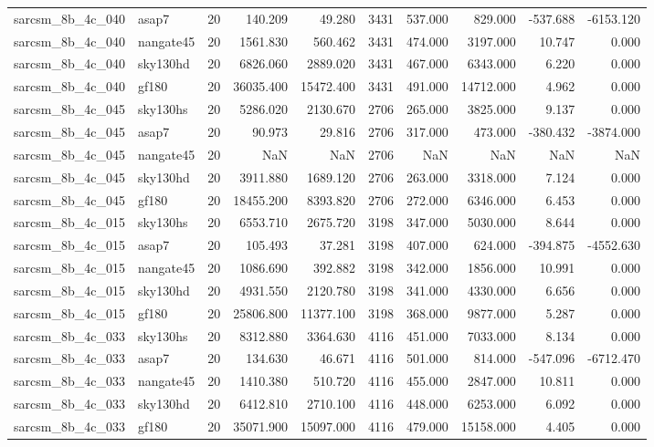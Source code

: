 \documentclass{article}
\begin{document}
\begin{longtable}{llrrrrrrrr}
sarcsm\_8b\_4c\_040 & asap7 & 20 & 140.209 & 49.280 & 3431 & 537.000 & 829.000 & -537.688 & -6153.120 \\
sarcsm\_8b\_4c\_040 & nangate45 & 20 & 1561.830 & 560.462 & 3431 & 474.000 & 3197.000 & 10.747 & 0.000 \\
sarcsm\_8b\_4c\_040 & sky130hd & 20 & 6826.060 & 2889.020 & 3431 & 467.000 & 6343.000 & 6.220 & 0.000 \\
sarcsm\_8b\_4c\_040 & gf180 & 20 & 36035.400 & 15472.400 & 3431 & 491.000 & 14712.000 & 4.962 & 0.000 \\
sarcsm\_8b\_4c\_045 & sky130hs & 20 & 5286.020 & 2130.670 & 2706 & 265.000 & 3825.000 & 9.137 & 0.000 \\
sarcsm\_8b\_4c\_045 & asap7 & 20 & 90.973 & 29.816 & 2706 & 317.000 & 473.000 & -380.432 & -3874.000 \\
sarcsm\_8b\_4c\_045 & nangate45 & 20 & NaN & NaN & 2706 & NaN & NaN & NaN & NaN \\
sarcsm\_8b\_4c\_045 & sky130hd & 20 & 3911.880 & 1689.120 & 2706 & 263.000 & 3318.000 & 7.124 & 0.000 \\
sarcsm\_8b\_4c\_045 & gf180 & 20 & 18455.200 & 8393.820 & 2706 & 272.000 & 6346.000 & 6.453 & 0.000 \\
sarcsm\_8b\_4c\_015 & sky130hs & 20 & 6553.710 & 2675.720 & 3198 & 347.000 & 5030.000 & 8.644 & 0.000 \\
sarcsm\_8b\_4c\_015 & asap7 & 20 & 105.493 & 37.281 & 3198 & 407.000 & 624.000 & -394.875 & -4552.630 \\
sarcsm\_8b\_4c\_015 & nangate45 & 20 & 1086.690 & 392.882 & 3198 & 342.000 & 1856.000 & 10.991 & 0.000 \\
sarcsm\_8b\_4c\_015 & sky130hd & 20 & 4931.550 & 2120.780 & 3198 & 341.000 & 4330.000 & 6.656 & 0.000 \\
sarcsm\_8b\_4c\_015 & gf180 & 20 & 25806.800 & 11377.100 & 3198 & 368.000 & 9877.000 & 5.287 & 0.000 \\
sarcsm\_8b\_4c\_033 & sky130hs & 20 & 8312.880 & 3364.630 & 4116 & 451.000 & 7033.000 & 8.134 & 0.000 \\
sarcsm\_8b\_4c\_033 & asap7 & 20 & 134.630 & 46.671 & 4116 & 501.000 & 814.000 & -547.096 & -6712.470 \\
sarcsm\_8b\_4c\_033 & nangate45 & 20 & 1410.380 & 510.720 & 4116 & 455.000 & 2847.000 & 10.811 & 0.000 \\
sarcsm\_8b\_4c\_033 & sky130hd & 20 & 6412.810 & 2710.100 & 4116 & 448.000 & 6253.000 & 6.092 & 0.000 \\
sarcsm\_8b\_4c\_033 & gf180 & 20 & 35071.900 & 15097.000 & 4116 & 479.000 & 15158.000 & 4.405 & 0.000 \\

\end{longtable}
\end{document}
